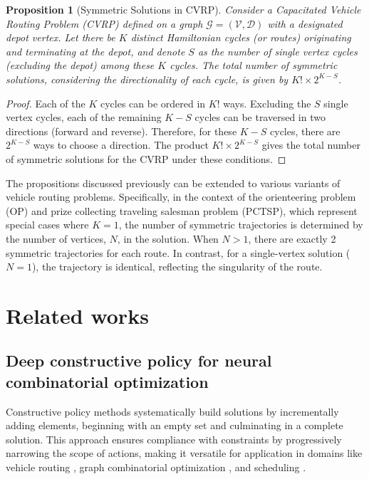 \documentclass[twoside]{article}
\theoremstyle{plain}
\newtheorem{proposition}[theorem]{Proposition}
\theoremstyle{definition}
\theoremstyle{remark}
\begin{document}
\begin{proposition}[Symmetric Solutions in CVRP]
Consider a Capacitated Vehicle Routing Problem (CVRP) defined on a graph \( \mathcal{G} = (\mathcal{V}, \mathcal{D}) \) with a designated depot vertex. Let there be \( K \) distinct Hamiltonian cycles (or routes) originating and terminating at the depot, and denote \( S \) as the number of single vertex cycles (excluding the depot) among these \( K \) cycles. The total number of symmetric solutions, considering the directionality of each cycle, is given by \( K! \times 2^{K-S} \).
\end{proposition}

\begin{proof}
Each of the \( K \) cycles can be ordered in \( K! \) ways. Excluding the \( S \) single vertex cycles, each of the remaining \( K-S \) cycles can be traversed in two directions (forward and reverse). Therefore, for these \( K-S \) cycles, there are \( 2^{K-S} \) ways to choose a direction. The product \( K! \times 2^{K-S} \) gives the total number of symmetric solutions for the CVRP under these conditions.
\end{proof}

The propositions discussed previously can be extended to various variants of vehicle routing problems. Specifically, in the context of the orienteering problem (OP) and prize collecting traveling salesman problem (PCTSP), which represent special cases where \( K = 1 \), the number of symmetric trajectories is determined by the number of vertices, \( N \), in the solution. When \( N > 1 \), there are exactly 2 symmetric trajectories for each route. In contrast, for a single-vertex solution (\( N = 1 \)), the trajectory is identical, reflecting the singularity of the route.


\section{Related works}\label{app:extended}

\subsection{Deep constructive policy for neural combinatorial optimization}


Constructive policy methods systematically build solutions by incrementally adding elements, beginning with an empty set and culminating in a complete solution. This approach ensures compliance with constraints by progressively narrowing the scope of actions, making it versatile for application in domains like vehicle routing \citep{Nazari, kool2018attention}, graph combinatorial optimization \citep{khalil2017learning, ahn2020learning, zhang2023let}, and scheduling \citep{zhang2020learning}.
\end{document}
